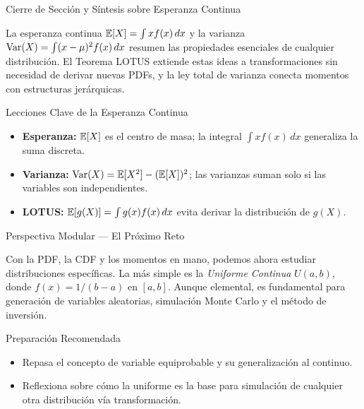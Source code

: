 \documentclass[10pt, aspectratio=169]{beamer}
\begin{document}
\begin{frame}{Cierre de Sección y Síntesis sobre Esperanza Continua}
  \begin{reflexion}
    La esperanza continua $\mathbb{E}[X] = \int x f(x)\,dx$ y la varianza $\operatorname{Var}(X) = \int (x - \mu)^{2} f(x)\,dx$ resumen las propiedades esenciales de cualquier distribución. El Teorema LOTUS extiende estas ideas a transformaciones sin necesidad de derivar nuevas PDFs, y la ley total de varianza conecta momentos con estructuras jerárquicas.
  \end{reflexion}

  \vspace{0.2cm}
  \pause
  \begin{block}{Lecciones Clave de la Esperanza Continua}
    \begin{itemize}\itemsep=0.08cm
      \item \textbf{Esperanza:} $\mathbb{E}[X]$ es el centro de masa; la integral $\int x f(x)\,dx$ generaliza la suma discreta.
      \item \textbf{Varianza:} $\operatorname{Var}(X) = \mathbb{E}[X^{2}] - (\mathbb{E}[X])^{2}$; las varianzas suman solo si las variables son independientes.
      \item \textbf{LOTUS:} $\mathbb{E}[g(X)] = \int g(x) f(x)\,dx$ evita derivar la distribución de $g(X)$.
    \end{itemize}
  \end{block}
\end{frame}

\begin{frame}{Perspectiva Modular --- El Próximo Reto}
  \scriptsize
  \begin{retoclase}
    Con la PDF, la CDF y los momentos en mano, podemos ahora estudiar distribuciones específicas. La más simple es la \emph{Uniforme Continua} $U(a, b)$, donde $f(x) = 1/(b-a)$ en $[a, b]$. Aunque elemental, es fundamental para generación de variables aleatorias, simulación Monte Carlo y el método de inversión.
  \end{retoclase}

  \vspace{0.08cm}
  \pause
  \begin{alertblock}{Preparación Recomendada}
    \begin{itemize}\itemsep=0.06cm
      \item Repasa el concepto de variable equiprobable y su generalización al continuo.
      \item Reflexiona sobre cómo la uniforme es la base para simulación de cualquier otra distribución vía transformación.
    \end{itemize}
  \end{alertblock}
\end{frame}
\end{document}
